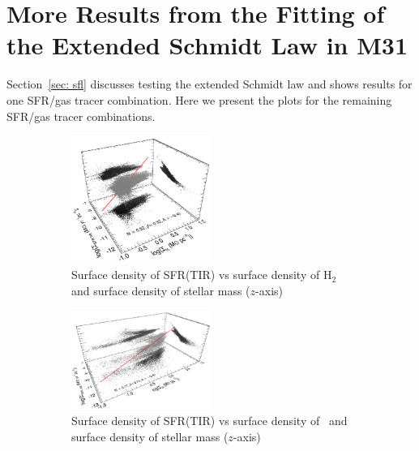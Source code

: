 \chapter{More Results from the Fitting of the Extended Schmidt Law in M31}
\pagestyle{plain}
\label{app:es,figs}
\myappendices

Section~\ref{sec: sfl} discusses testing the extended Schmidt law and shows results for one SFR/gas tracer combination. Here we present the plots for the remaining SFR/gas tracer combinations.

\begin{figure}
    \centering
    \begin{subfigure}[b]{\textwidth}
        \centering
        \includegraphics[width=0.5\textwidth]{../image_paper1/es_tot_fir_vs_h2.png}
        \captionsetup{font=tiny}
        \caption{Surface density of SFR(TIR) vs surface density of H$_2$ and surface density of stellar mass ($z$-axis) }
        \label{fig:es,all,fir,h2}
    \end{subfigure}
    \hfill
    \begin{subfigure}[b]{\textwidth}
        \centering
        \includegraphics[width=0.5\textwidth]{../image_paper1/es_tot_fir_vs_hi2.png}
        \captionsetup{font=tiny}
        \caption{Surface density of SFR(TIR) vs surface density of \hi\ and surface density of stellar mass ($z$-axis) }
        \label{fig:es,all,fir,hi}
    \end{subfigure}
    \hfill
   \begin{subfigure}[b]{\textwidth}

\end{subfigure}
\end{figure}
